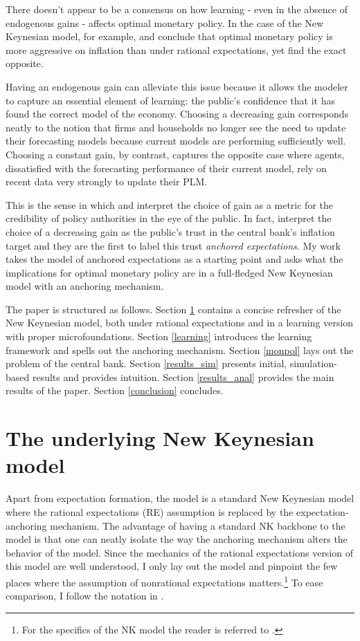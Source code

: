 \documentclass[11pt]{article}
\renewcommand{\[}{\begin{equation}}
\renewcommand{\]}{\end{equation}}
\begin{document}
There doesn't appear to be a consensus on how learning - even in the absence of endogenous gains - affects optimal monetary policy. In the case of the New Keynesian model, for example, \cite{eusepi2018science} and \cite{molnar2014optimal} conclude that optimal monetary policy is more aggressive on inflation than under rational expectations, yet \cite{eusepi2018limits} find the exact opposite.

Having an endogenous gain can alleviate this issue because it allows the modeler to capture an essential element of learning: the public's confidence that it has found the correct model of the economy. Choosing a decreasing gain corresponds neatly to the notion that firms and households no longer see the need to update their forecasting models because current models are performing sufficiently well. Choosing a constant gain, by contrast, captures the opposite case where agents, dissatisfied with the forecasting performance of their current model, rely on recent data very strongly to update their PLM. 

This is the sense in which \cite{LUBIK201685} and \cite{carvalho2019anchored} interpret the choice of gain as a metric for the credibility of policy authorities in the eye of the public. In fact, \cite{carvalho2019anchored} interpret the choice of a decreasing gain as the public's trust in the central bank's inflation target and they are the first to label this trust \emph{anchored expectations}. My work takes the \cite{carvalho2019anchored} model of anchored expectations as a starting point and asks what the implications for optimal monetary policy are in a full-fledged New Keynesian model with an anchoring mechanism. 

The paper is structured as follows. Section \ref{NK} contains a concise refresher of the New Keynesian model, both under rational expectations and in a learning version with proper microfoundations. Section \ref{learning} introduces the learning framework and spells out the anchoring mechanism. Section \ref{monpol} lays out the problem of the central bank. Section \ref{results_sim} presents initial, simulation-based results and provides intuition. Section \ref{results_anal} provides the main results of the paper. Section \ref{conclusion} concludes.

\newpage
\section{The underlying New Keynesian model}\label{NK}
Apart from expectation formation, the model is a standard New Keynesian model where the rational expectations (RE) assumption is replaced by the expectation-anchoring mechanism. The advantage of having a standard NK backbone to the model is that one can neatly isolate the way the anchoring mechanism alters the behavior of the model. Since the mechanics of the rational expectations version of this model are well understood, I only lay out the model and pinpoint the few places where the assumption of nonrational expectations matters.\footnote{For the specifics of the NK model the reader is referred to \cite{woodford2011interest}.} To ease comparison, I follow the notation in \cite{woodford2011interest}. 
\end{document}
